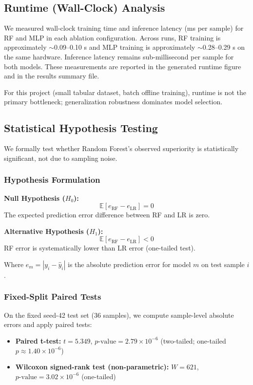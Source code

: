 \documentclass[conference]{IEEEtran}
\begin{document}
\subsection{Runtime (Wall-Clock) Analysis}
We measured wall-clock training time and inference latency (ms per sample) for RF and MLP in each ablation configuration. Across runs, RF training is approximately $\sim$0.09--0.10 s and MLP training is approximately $\sim$0.28--0.29 s on the same hardware. Inference latency remains sub-millisecond per sample for both models. These measurements are reported in the generated runtime figure and in the results summary file.

For this project (small tabular dataset, batch offline training), runtime is not the primary bottleneck; generalization robustness dominates model selection.

\subsection{Statistical Hypothesis Testing}

We formally test whether Random Forest's observed superiority is statistically significant, not due to sampling noise.

\subsubsection{Hypothesis Formulation}

\textbf{Null Hypothesis ($H_0$):}
\[
\mathbb{E}[e_{\text{RF}} - e_{\text{LR}}] = 0
\]
The expected prediction error difference between RF and LR is zero.

\textbf{Alternative Hypothesis ($H_1$):}
\[
\mathbb{E}[e_{\text{RF}} - e_{\text{LR}}] < 0
\]
RF error is systematically lower than LR error (one-tailed test).

Where $e_m = |y_i - \hat{y}_i|$ is the absolute prediction error for model $m$ on test sample $i$.

\subsubsection{Fixed-Split Paired Tests}

On the fixed seed-42 test set (36 samples), we compute sample-level absolute errors and apply paired tests:

\begin{itemize}
\item \textbf{Paired t-test:} $t = 5.349$, $p\text{-value} = 2.79 \times 10^{-6}$ (two-tailed; one-tailed $p \approx 1.40 \times 10^{-6}$)
\item \textbf{Wilcoxon signed-rank test (non-parametric):} $W = 621$, $p\text{-value} = 3.02 \times 10^{-6}$ (one-tailed)
\end{itemize}
\end{document}
